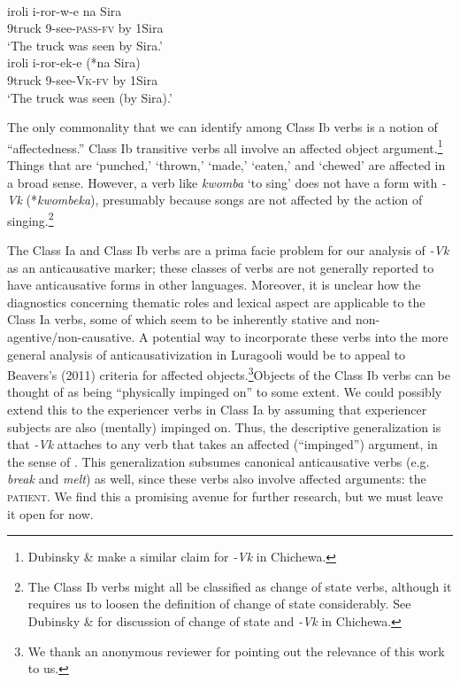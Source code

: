 \documentclass[output=paper]{langsci/langscibook}
\begin{document}
\ea\label{exx:}
\ea
{}\\
\gll iroli      i-ror-w-e         na Sira\\
     9truck  9-see-\textsc{pass-fv} by 1Sira\\
\glt ‘The truck was seen by Sira.’ 
\ex
{}\\
\gll iroli    i-ror-ek-e       (*na Sira)\\
     9truck 9-see-\textsc{Vk}\textsc{-}\textsc{fv}   by 1Sira\\
\glt ‘The truck was seen (by Sira).’
\z
\z

The only commonality that we can identify among Class Ib verbs is a notion of “affectedness.” Class Ib transitive verbs all involve an affected object argument.\footnote{ Dubinsky \& \citet{Simango1996} make a similar claim for \textit{-Vk} in Chichewa.} Things that are ‘punched,’ ‘thrown,’ ‘made,’ ‘eaten,’ and ‘chewed’ are affected in a broad sense. However, a verb like \textit{kwomba} ‘to sing’ does not have a form with \textit{-Vk} (*\textit{kwombeka}), presumably because songs are not affected by the action of singing.\footnote{ The Class Ib verbs might all be classified as change of state verbs, although it requires us to loosen the definition of change of state considerably. See Dubinsky \& \citet{Simango1996} for discussion of change of state and \textit{-Vk} in Chichewa.}

The Class Ia and Class Ib verbs are a prima facie problem for our analysis of \textit{-Vk} as an anticausative marker; these classes of verbs are not generally reported to have anticausative forms in other languages. Moreover, it is unclear how the diagnostics concerning thematic roles and lexical aspect are applicable to the Class Ia verbs, some of which seem to be inherently stative and non-agentive/non-causative. A potential way to incorporate these verbs into the more general analysis of anticausativization in Luragooli would be to appeal to Beavers’s (2011) criteria for affected objects.\footnote{ We thank an anonymous reviewer for pointing out the relevance of this work to us.}Objects\textsc{ }of the Class Ib verbs can be thought of as being “physically impinged on” to some extent. We could possibly extend this to the experiencer verbs in Class Ia by assuming that experiencer subjects are also (mentally) impinged on. Thus, the descriptive generalization is that  \textit{-Vk} attaches to any verb that takes an affected (“impinged”) argument, in the sense of \citet{Beavers2011}. This generalization subsumes canonical anticausative verbs (e.g. \textit{break} and \textit{melt}) as well, since these verbs also involve affected arguments: the \textsc{patient}. We find this a promising avenue for further research, but we must leave it open for now.
\end{document}
